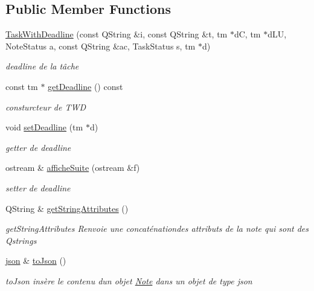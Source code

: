 \subsection*{Public Member Functions}
\begin{DoxyCompactItemize}
\item 
\mbox{\label{classTaskWithDeadline_a6d294d345c73622d7519bd98e0643bce}} 
\hyperlink{classTaskWithDeadline_a6d294d345c73622d7519bd98e0643bce}{Task\+With\+Deadline} (const Q\+String \&i, const Q\+String \&t, tm $\ast$dC, tm $\ast$d\+LU, Note\+Status a, const Q\+String \&ac, Task\+Status s, tm $\ast$d)
\begin{DoxyCompactList}\small\item\em deadline de la tâche \end{DoxyCompactList}\item 
\mbox{\label{classTaskWithDeadline_a5b99ef9cb107583ef086bdb49563590b}} 
const tm $\ast$ \hyperlink{classTaskWithDeadline_a5b99ef9cb107583ef086bdb49563590b}{get\+Deadline} () const
\begin{DoxyCompactList}\small\item\em consturcteur de T\+WD \end{DoxyCompactList}\item 
\mbox{\label{classTaskWithDeadline_a31e7fd58f1c74d4b4487af4161789e03}} 
void \hyperlink{classTaskWithDeadline_a31e7fd58f1c74d4b4487af4161789e03}{set\+Deadline} (tm $\ast$d)
\begin{DoxyCompactList}\small\item\em getter de deadline \end{DoxyCompactList}\item 
ostream \& \hyperlink{classTaskWithDeadline_a594623304e3500104c071ebbb95d1670}{affiche\+Suite} (ostream \&f)
\begin{DoxyCompactList}\small\item\em setter de deadline \end{DoxyCompactList}\item 
Q\+String \& \hyperlink{classTaskWithDeadline_a2fda40b455e7eebb550b41edf451dfdb}{get\+String\+Attributes} ()
\begin{DoxyCompactList}\small\item\em get\+String\+Attributes Renvoie une concaténationdes attributs de la note qui sont des Qstrings \end{DoxyCompactList}\item 
\hyperlink{classnlohmann_1_1basic__json}{json} \& \hyperlink{classTaskWithDeadline_a7ded765b2eb469cb31538bd52f75ae6e}{to\+Json} ()
\begin{DoxyCompactList}\small\item\em to\+Json insère le contenu d\textquotesingle{}un objet \hyperlink{classNote}{Note} dans un objet de type json \end{DoxyCompactList}\end{DoxyCompactItemize}
